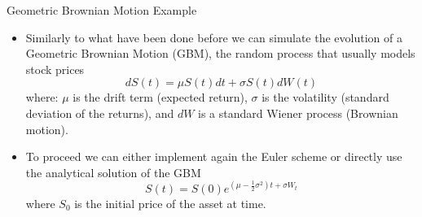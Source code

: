 \documentclass{beamer}
\begin{document}
\begin{frame}{Geometric Brownian Motion Example}
\begin{itemize}
    \item Similarly to what have been done before we can simulate the evolution of a Geometric Brownian Motion (GBM), the random process that usually models stock prices
    \begin{equation*}
        dS(t) = \mu S(t) dt + \sigma S(t) dW(t)
    \end{equation*}
    where: $\mu$ is the drift term (expected return), $\sigma$ is the volatility (standard deviation of the returns), and $dW$ is a standard Wiener process (Brownian motion).
    \item To proceed we can either implement again the Euler scheme or directly use the analytical solution of the GBM
    \begin{equation*}
        S(t) = S(0)e^{(\mu-\frac{1}{2}\sigma^2)t+\sigma W_t}
    \end{equation*}
    where $S_0$ is the initial price of the asset at time.
\end{itemize}
\end{frame}
\end{document}
